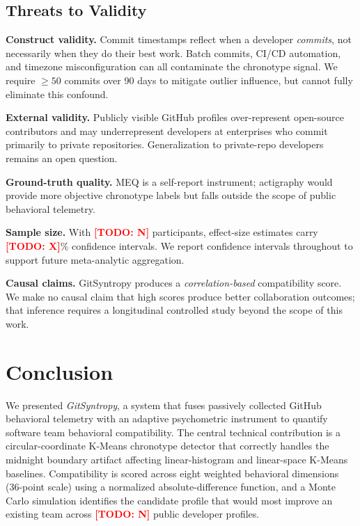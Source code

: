 \documentclass[conference]{IEEEtran}
\newcommand{\TODO}[1]{\textcolor{red}{\textbf{[TODO: #1]}}}
\begin{document}
\subsection{Threats to Validity}

\textbf{Construct validity.}
Commit timestamps reflect when a developer \emph{commits}, not
necessarily when they do their best work.
Batch commits, CI/CD automation, and timezone misconfiguration can
all contaminate the chronotype signal.
We require $\geq 50$ commits over 90 days to mitigate outlier
influence, but cannot fully eliminate this confound.

\textbf{External validity.}
Publicly visible GitHub profiles over-represent open-source
contributors and may underrepresent developers at enterprises who
commit primarily to private repositories.
Generalization to private-repo developers remains an open question.

\textbf{Ground-truth quality.}
MEQ is a self-report instrument; actigraphy would provide more
objective chronotype labels but falls outside the scope of public
behavioral telemetry.

\textbf{Sample size.}
With \TODO{N} participants, effect-size estimates carry \TODO{X}\%
confidence intervals.
We report confidence intervals throughout to support future
meta-analytic aggregation.

\textbf{Causal claims.}
GitSyntropy produces a \emph{correlation-based} compatibility score.
We make no causal claim that high scores produce better collaboration
outcomes; that inference requires a longitudinal controlled study
beyond the scope of this work.

\section{Conclusion}
\label{sec:conclusion}

We presented \textit{GitSyntropy}, a system that fuses passively
collected GitHub behavioral telemetry with an adaptive psychometric
instrument to quantify software team behavioral compatibility.
The central technical contribution is a circular-coordinate K-Means
chronotype detector that correctly handles the midnight boundary
artifact affecting linear-histogram and linear-space K-Means baselines.
Compatibility is scored across eight weighted behavioral dimensions
(36-point scale) using a normalized absolute-difference function, and
a Monte Carlo simulation identifies the candidate profile that would
most improve an existing team across \TODO{N} public developer profiles.
\end{document}
